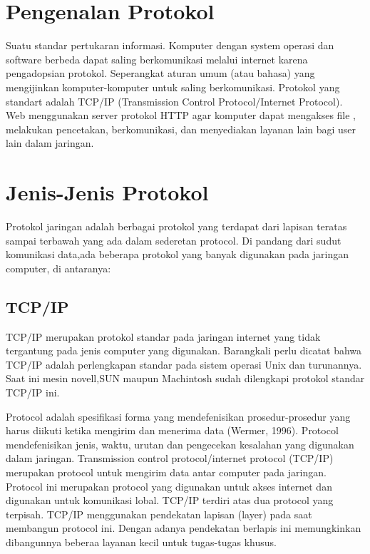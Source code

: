 

\section{Pengenalan Protokol} 
 Suatu standar pertukaran informasi. Komputer dengan system operasi dan software berbeda dapat saling berkomunikasi melalui internet 
 karena pengadopsian protokol. Seperangkat aturan umum (atau bahasa) yang mengijinkan komputer-komputer untuk saling berkomunikasi. 
 Protokol yang standart adalah TCP/IP (Transmission Control Protocol/Internet Protocol). Web menggunakan server protokol HTTP agar 
 komputer dapat mengakses file , melakukan pencetakan, berkomunikasi, dan menyediakan layanan lain bagi user lain dalam jaringan.
 
 \section{Jenis-Jenis Protokol}
Protokol jaringan adalah berbagai protokol yang terdapat dari lapisan  teratas sampai terbawah yang ada dalam sederetan protocol.
Di pandang dari sudut komunikasi data,ada beberapa protokol yang banyak digunakan pada jaringan computer, di antaranya:

 \subsection{TCP/IP}
TCP/IP merupakan protokol standar pada jaringan internet yang tidak tergantung pada jenis computer yang digunakan.
Barangkali perlu dicatat bahwa TCP/IP adalah perlengkapan standar pada sistem operasi Unix dan turunannya.
Saat ini mesin novell,SUN maupun Machintosh sudah dilengkapi protokol standar TCP/IP ini.

Protocol adalah spesifikasi forma yang mendefenisikan prosedur-prosedur yang harus diikuti ketika mengirim dan menerima data (Wermer, 
1996). Protocol mendefenisikan jenis, waktu, urutan dan pengecekan kesalahan yang digunakan dalam jaringan. Transmission control 
protocol/internet protocol (TCP/IP) merupakan protocol untuk mengirim data antar computer pada jaringan. Protocol ini merupakan protocol 
yang digunakan untuk akses internet dan digunakan untuk komunikasi lobal. TCP/IP terdiri atas dua protocol yang terpisah. TCP/IP 
menggunakan pendekatan lapisan (layer) pada saat membangun protocol ini. Dengan adanya pendekatan berlapis ini memungkinkan dibangunnya 
beberaa layanan kecil untuk tugas-tugas khusus.
  
